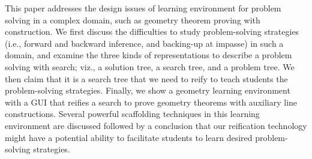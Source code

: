 This paper addresses the design issues of learning environment for
problem solving in a complex domain, such as geometry theorem proving
with construction.  We first discuss the difficulties to study
problem-solving strategies (i.e., forward and backward inference, and
backing-up at impasse) in such a domain, and examine the three kinds of
representations to describe a problem solving with search; viz., a
solution tree, a search tree, and a problem tree.  We then claim that it
is a search tree that we need to reify to teach students the
problem-solving strategies.  Finally, we show a geometry learning
environment with a GUI that reifies a search to prove geometry theorems
with auxiliary line constructions.  Several powerful scaffolding
techniques in this learning environment are discussed followed by a
conclusion that our reification technology might have a potential
ability to facilitate students to learn desired problem-solving
strategies.

